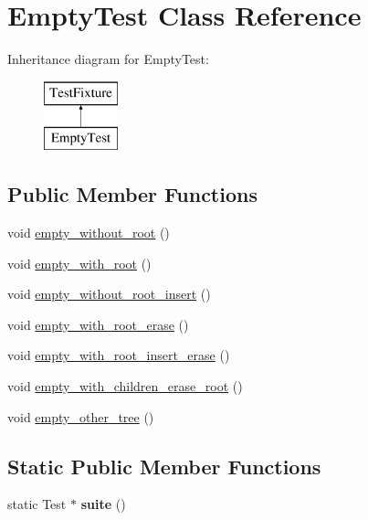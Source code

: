 \hypertarget{class_empty_test}{}\section{Empty\+Test Class Reference}
\label{class_empty_test}
Inheritance diagram for Empty\+Test\+:\begin{figure}[H]
\begin{center}
\leavevmode
\includegraphics[height=2.000000cm]{class_empty_test}
\end{center}
\end{figure}
\subsection*{Public Member Functions}
\begin{DoxyCompactItemize}
\item 
void \hyperlink{class_empty_test_a27a72313c820dae24223b04c4f1cc376}{empty\+\_\+without\+\_\+root} ()
\item 
void \hyperlink{class_empty_test_abd96646c19026d62a5317285cbf5f49b}{empty\+\_\+with\+\_\+root} ()
\item 
void \hyperlink{class_empty_test_ad17133b184176d9d8b0511168d13ca6b}{empty\+\_\+without\+\_\+root\+\_\+insert} ()
\item 
void \hyperlink{class_empty_test_a5112f76f08ce5f0b52016ea8a8afff4b}{empty\+\_\+with\+\_\+root\+\_\+erase} ()
\item 
void \hyperlink{class_empty_test_a6a62d370484dd86a856514d168d176d4}{empty\+\_\+with\+\_\+root\+\_\+insert\+\_\+erase} ()
\item 
void \hyperlink{class_empty_test_a07de70993f853c66e95865432fc4ce7f}{empty\+\_\+with\+\_\+children\+\_\+erase\+\_\+root} ()
\item 
void \hyperlink{class_empty_test_a6373058c0b937d07bb07b8482f663315}{empty\+\_\+other\+\_\+tree} ()
\end{DoxyCompactItemize}
\subsection*{Static Public Member Functions}
\begin{DoxyCompactItemize}
\item 
\mbox{\label{class_empty_test_a48e2fa8b65dab0443ba90e57289a58cf}} 
static Test $\ast$ {\bfseries suite} ()
\end{DoxyCompactItemize}


